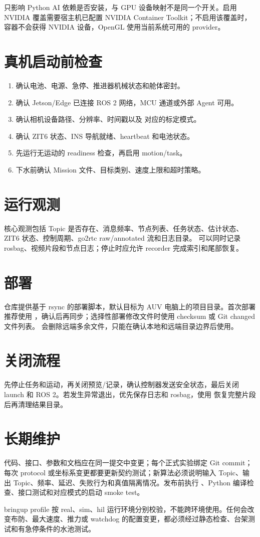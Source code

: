  只影响 Python AI 依赖是否安装，与 GPU 设备映射不是同一个开关。启用 NVIDIA 覆盖需要宿主机已配置 NVIDIA Container Toolkit；不启用该覆盖时，容器不会获得 NVIDIA 设备，OpenGL 使用当前系统可用的 provider。

\section{真机启动前检查}
\begin{enumerate}
  \item 确认电池、电源、急停、推进器机械状态和舱体密封。
  \item 确认 Jetson/Edge 已连接 ROS 2 网络，MCU 通道或外部 Agent 可用。
  \item 确认相机设备路径、分辨率、时间戳以及  对应的标定模式。
  \item 确认 ZIT6 状态、INS 导航就绪、heartbeat 和电池状态。
  \item 先运行无运动的 readiness 检查，再启用 motion/task。
  \item 下水前确认 Mission 文件、目标类别、速度上限和超时策略。
\end{enumerate}

\section{运行观测}
核心观测包括 Topic 是否存在、消息频率、节点列表、任务状态、估计状态、ZIT6 状态、控制周期、go2rtc raw/annotated 流和日志目录。 可以同时记录 rosbag、视频片段和节点日志；停止时应允许 recorder 完成索引和尾部恢复。

\section{部署}
仓库提供基于 rsync 的部署脚本，默认目标为 AUV 电脑上的项目目录。首次部署推荐使用 ，确认后再同步；选择性部署修改文件时使用 checksum 或 Git changed 文件列表。 会删除远端多余文件，只能在确认本地和远端目录边界后使用。

\section{关闭流程}
先停止任务和运动，再关闭预览/记录，确认控制器发送安全状态，最后关闭 launch 和 ROS 2。若发生异常退出，优先保存日志和 rosbag，使用  恢复完整片段后再清理结果目录。

\section{长期维护}
代码、接口、参数和文档应在同一提交中变更；每个正式实验绑定 Git commit；每次 protocol 或坐标系变更都要更新契约测试；新算法必须说明输入 Topic、输出 Topic、频率、延迟、失败行为和真值隔离情况。发布前执行 、Python 编译检查、接口测试和对应模式的启动 smoke test。

\begin{warningbox}
bringup profile 按 real、sim、hil 运行环境分别校验，不能跨环境使用。任何会改变布防、最大速度、推力或 watchdog 的配置变更，都必须经过静态检查、台架测试和有急停条件的水池测试。
\end{warningbox}

